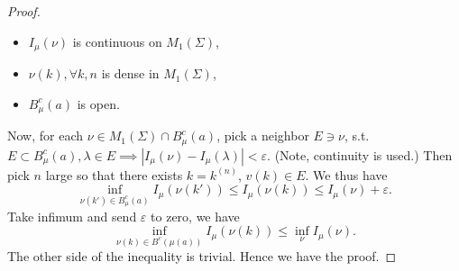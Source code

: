 \begin{proof}
\begin{itemize}
		\item $I_\mu(\nu)$ is continuous on $M_1(\Sigma)$,
		\item $\nu(k), \forall k, n$ is dense in $M_1(\Sigma)$,
		\item $B^c_\mu(a)$ is open.
	\end{itemize}
	Now, for each $\nu \in M_1(\Sigma) \cap B^c_\mu(a)$, pick a neighbor $E \ni \nu$, s.t. $E \subset B^c_\mu(a), \lambda \in E \implies |I_\mu(\nu) - I_\mu(\lambda)| < \varepsilon$. (Note, continuity is used.) Then pick $n$ large so that there exists $k = k^{(n)} $, $v(k) \in E$. We thus have
\[
	\inf _{\nu(k') \in B^c_\mu(a)} I_\mu(\nu(k'))
	\le I_\mu\left( \nu(k) \right) 
	\le I_\mu(\nu) + \varepsilon
.\] 
Take infimum and send $\varepsilon$ to zero, we have
\[
	\inf _{\nu(k) \in B^c(\mu(a))} I_\mu(\nu(k)) \le 
	\inf _{\nu} I_\mu(\nu)
.\] 
The other side of the inequality is trivial. Hence we have the proof.


\end{proof}

